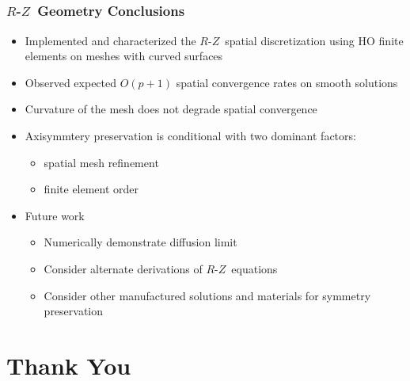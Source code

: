 \documentclass[compress,t]{beamer}
\newcommand{\RZ}{$R$-$Z$}
\begin{document}
\subsection{}
\begin{frame}
\frametitle{\RZ\ Geometry Conclusions}

\begin{itemize}
\item{Implemented and characterized the \RZ\ spatial discretization using HO finite elements on meshes with curved surfaces}
\item{Observed expected $O(p+1)$ spatial convergence rates on smooth solutions}
\item{Curvature of the mesh does not degrade spatial convergence}
\item{Axisymmtery preservation is conditional with two dominant factors:}
\begin{itemize}
\item{spatial mesh refinement}
\item{finite element order}
\end{itemize}
\item{Future work}
\begin{itemize}
\item{Numerically demonstrate diffusion limit}
\item{Consider alternate derivations of \RZ\ equations}
\item{Consider other manufactured solutions and materials for symmetry preservation}
\end{itemize}
\end{itemize}

\end{frame}

\section{Thank You}
\subsection{}
\end{document}
